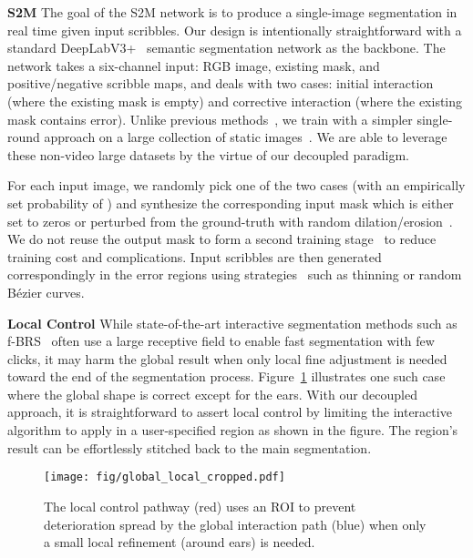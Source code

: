 \documentclass[final]{cvpr}
\begin{document}
	\vspace{0.1in}
	\noindent\textbf{S2M}\space\space
	The goal of the S2M network is to produce a single-image segmentation in real time given input scribbles.
	Our design is intentionally straightforward with a standard DeepLabV3+~\cite{chen2018encoderDeepLabV3+} semantic segmentation network as the backbone. The network takes a six-channel input: RGB image, existing mask, and positive/negative scribble maps, and deals with two cases: initial interaction (where the existing mask is empty) and corrective interaction (where the existing mask contains error).
	Unlike previous methods~\cite{oh2020STMPAMI, oh2019fastInteractive, Yuk2020IVOSGlobalLocal}, we train with a simpler single-round approach on a large collection of static images~\cite{gupta2019lvis, zeng2019towardsHRSOD, shi2015hierarchicalECSSD, FSS1000}. We are able to leverage these non-video large datasets by the virtue of our decoupled paradigm.
	
	For each input image, we randomly pick one of the two cases (with an empirically set probability of ) and synthesize the corresponding input mask which is either set to zeros or perturbed from the ground-truth with random dilation/erosion~\cite{CascadePSP2020}. We do not reuse the output mask to form a second training stage~\cite{oh2020STMPAMI, oh2019fastInteractive, Yuk2020IVOSGlobalLocal} to reduce training cost and complications. Input scribbles are then generated correspondingly in the error regions using strategies~\cite{Caelles_arXiv_2019} such as thinning or random B\'ezier curves.
	
	\vspace{0.1in}
	\noindent\textbf{Local Control}\space\space
	While state-of-the-art interactive segmentation methods such as f-BRS~\cite{sofiiuk2020fbrs} often use a large receptive field to enable fast segmentation with few clicks, it may harm the global result when only local fine adjustment is needed toward the end of the segmentation process. Figure~\ref{fig:global_local} illustrates one such case where the global shape is correct except for the ears. With our decoupled approach, it is straightforward to assert local control by limiting the interactive algorithm to apply in a user-specified region as shown in the figure. The region's result can be effortlessly stitched back to the main segmentation. 
	\begin{figure}[h]
		\vspace{-0.15in}
		\begin{center}
			\texttt{[image: fig/global\_local\_cropped.pdf]}
		\end{center}
		\vspace{-0.15in}
		\caption{
			The local control pathway (red) uses an ROI to prevent deterioration spread by the global interaction path (blue) when only a small local refinement (around ears) is needed.
		}
		\label{fig:global_local}
		\vspace{-0.15in}
	\end{figure}
	
\end{document}
